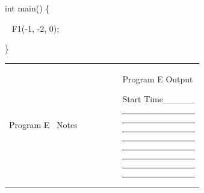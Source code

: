 \documentclass[12pt, a4paper, oneside]{article}
\begin{document}
{int main() \{}

{~ F1(-1, -2, 0);}

{\}}

{}

{}

\begin{longtable}[]{@{}ll@{}}
\toprule
\begin{minipage}[t]{0.47\columnwidth}\raggedright\strut
{Program E ~Notes ~~~~~~~~}
\strut\end{minipage} &
\begin{minipage}[t]{0.47\columnwidth}\raggedright\strut
{Program E Output}

{}

{}

{Start Time\_\_\_\_\_}

{}

\begin{center}\rule{0.5\linewidth}{\linethickness}\end{center}

{}

\begin{center}\rule{0.5\linewidth}{\linethickness}\end{center}

{}

\begin{center}\rule{0.5\linewidth}{\linethickness}\end{center}

{}

\begin{center}\rule{0.5\linewidth}{\linethickness}\end{center}

{}

\begin{center}\rule{0.5\linewidth}{\linethickness}\end{center}

{}

\begin{center}\rule{0.5\linewidth}{\linethickness}\end{center}

{}

\begin{center}\rule{0.5\linewidth}{\linethickness}\end{center}

{}

\begin{center}\rule{0.5\linewidth}{\linethickness}\end{center}


\end{minipage}
\end{longtable}
\end{document}
